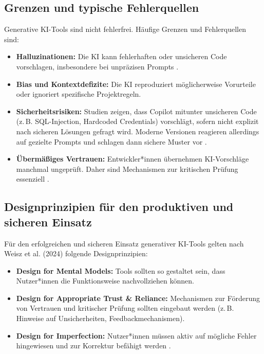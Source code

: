 \subsection{Grenzen und typische Fehlerquellen}

Generative KI-Tools sind nicht fehlerfrei. Häufige Grenzen und Fehlerquellen
sind:
\begin{itemize}
    \item \textbf{Halluzinationen:} Die KI kann fehlerhaften oder unsicheren Code vorschlagen, insbesondere bei unpräzisen Prompts \cite{shi_ai-assisted_2023}.
    \item \textbf{Bias und Kontextdefizite:} Die KI reproduziert möglicherweise Vorurteile oder ignoriert spezifische Projektregeln.
    \item \textbf{Sicherheitsrisiken:} Studien zeigen, dass Copilot mitunter unsicheren Code (z.\,B. SQL-Injection, Hardcoded Credentials) vorschlägt, sofern nicht explizit nach sicheren Lösungen gefragt wird. Moderne Versionen reagieren allerdings auf gezielte Prompts und schlagen dann sichere Muster vor \cite{shi_ai-assisted_2023}.
    \item \textbf{Übermäßiges Vertrauen:} Entwickler*innen übernehmen KI-Vorschläge manchmal ungeprüft. Daher sind Mechanismen zur kritischen Prüfung essenziell \cite{weisz_design_2024}.
\end{itemize}

\subsection{Designprinzipien für den produktiven und sicheren Einsatz}

Für den erfolgreichen und sicheren Einsatz generativer KI-Tools gelten nach
Weisz et al. (2024) folgende Designprinzipien:
\begin{itemize}
    \item \textbf{Design for Mental Models:} Tools sollten so gestaltet sein, dass Nutzer*innen die Funktionsweise nachvollziehen können.
    \item \textbf{Design for Appropriate Trust \& Reliance:} Mechanismen zur Förderung von Vertrauen und kritischer Prüfung sollten eingebaut werden (z.\,B. Hinweise auf Unsicherheiten, Feedbackmechanismen).
    \item \textbf{Design for Imperfection:} Nutzer*innen müssen aktiv auf mögliche Fehler hingewiesen und zur Korrektur befähigt werden \cite{weisz_design_2024}.
\end{itemize}

